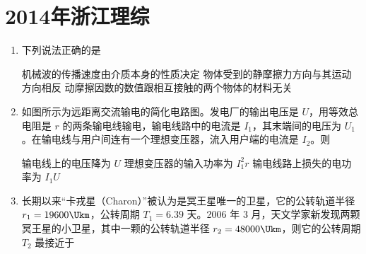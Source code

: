 \documentclass[\gkver]{gaokaozhenti}
\begin{document}
\chapter{2014年浙江理综}

\begin{enumerate}
\item
下列说法正确的是

{机械波的传播速度由介质本身的性质决定}
{物体受到的静摩擦力方向与其运动方向相反}
{动摩擦因数的数值跟相互接触的两个物体的材料无关}


\item
如图所示为远距离交流输电的简化电路图。发电厂的输出电压是 $U$，用等效总电阻是 $r$ 的两条输电线输电，输电线路中的电流是 $I_{1}$，其末端间的电压为 $U_{1}$。在输电线与用户间连有一个理想变压器，流入用户端的电流是 $I_{2}$。则


{输电线上的电压降为 $U$}
{理想变压器的输入功率为 $I_{1}^{2}r$}
{输电线路上损失的电功率为 $I_{1}U$}


\item
长期以来“卡戎星（Charon）”被认为是冥王星唯一的卫星，它的公转轨道半径 $r_{1}=19600\Ukm$，公转周期 $T_{1}=6.39$ 天。2006 年 3 月，天文学家新发现两颗冥王星的小卫星，其中一颗的公转轨道半径 $r_{2}=48000\Ukm$，则它的公转周期 $T_{2}$ 最接近于


\end{enumerate}
\end{document}
